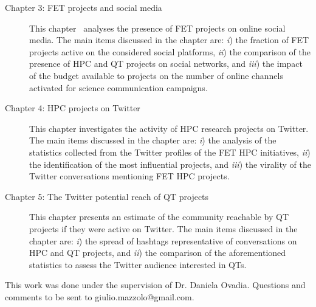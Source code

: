 \begin{description}
 \item[Chapter 3: FET projects and social media] This chapter \, analyses the presence of FET projects on online social media. The main items discussed in the chapter are: \emph{i}) the fraction of FET projects active on the considered social platforms, \emph{ii}) the comparison of the presence of HPC and QT projects on social networks, and \emph{iii}) the impact of the budget available to projects on the number of online channels activated for science communication campaigns.

 \item[Chapter 4: HPC projects on Twitter] This chapter investigates the activity of HPC research projects on Twitter. The main items discussed in the chapter are: \emph{i}) the analysis of the statistics collected from the Twitter profiles of the FET HPC initiatives, \emph{ii}) the identification of the most influential projects, and \emph{iii}) the virality of the Twitter conversations mentioning FET HPC projects.

 \item[Chapter 5: The Twitter potential reach of QT projects] This chapter presents an estimate of the community reachable by QT projects if they were active on Twitter. The main items discussed in the chapter are: \emph{i}) the spread of hashtags representative of conversations on HPC and QT projects, and \emph{ii}) the comparison of the aforementioned statistics to assess the Twitter audience interested in QTs.
\end{description}

\noindent
This work was done under the supervision of Dr. Daniela Ovadia. Questions and comments to be sent to giulio.mazzolo@gmail.com.